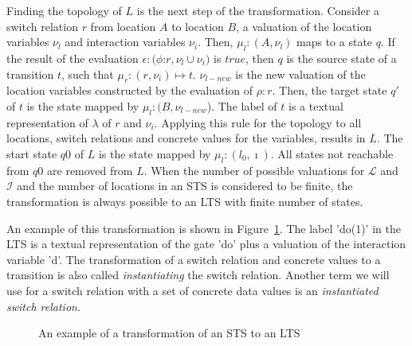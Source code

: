 Finding the topology of $L$ is the next step of the transformation. Consider a switch relation $r$ from location $A$ to location $B$, a valuation of the location variables $\nu_l$ and interaction variables $\nu_i$. Then, $\mu_l:(A,\nu_l)$ maps to a state $q$. If the result of the evaluation $\epsilon:(\phi$:$r, \nu_l \cup \nu_i)$ is $\mathit{true}$, then $q$ is the source state of a transition $t$, such that $\mu_r:(r, \nu_i) \mapsto t$. $\nu_{l-new}$ is the new valuation of the location variables constructed by the evaluation of $\rho:r$. Then, the target state $q'$ of $t$ is the state mapped by $\mu_l:(B,\nu_{l-new}$). The label of $t$ is a textual representation of $\lambda$ of $r$ and $\nu_i$. Applying this rule for the topology to all locations, switch relations and concrete values for the variables, results in $L$. The start state $q0$ of $L$ is the state mapped by $\mu_l:(l_0,\imath)$. All states not reachable from $q0$ are removed from $L$. When the number of possible valuations for $\mathcal{L}$ and $\mathcal{I}$ and the number of locations in an STS is considered to be finite, the transformation is always possible to an LTS with finite number of states.

An example of this transformation is shown in Figure~\ref{fig:example_trafo}. The label 'do(1)' in the LTS is a textual representation of the gate 'do' plus a valuation of the interaction variable 'd'. The transformation of a switch relation and concrete values to a transition is also called \textit{instantiating} the switch relation. Another term we will use for a switch relation with a set of concrete data values is an \textit{instantiated switch relation}.

\begin{figure}[ht]
  \begin{center}
    \hspace{20px}
  \end{center}
  \caption{An example of a transformation of an STS to an LTS}
  \label{fig:example_trafo}
\end{figure}

